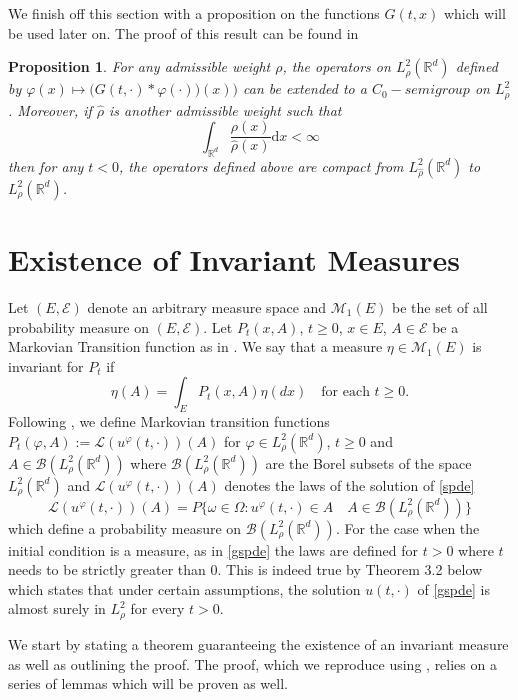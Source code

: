 \documentclass{article}
\newtheorem{proposition}{Proposition}
\numberwithin{equation}{section}
\newcommand{\R}{\mathbb{R}}
\newcommand{\ud}{\ensuremath{\mathrm{d}}}
\begin{document}
We finish off this section with a proposition on the functions $G(t,x)$ which will be used later on. The proof of this result can be found in \cite{TessitoreZabczyk98M} \\

\begin{proposition} \textit{For any admissible weight $\rho$, the operators on $L^2_\rho(\R^d)$ defined by $\varphi(x) \mapsto \big(G(t,\cdot)*\varphi(\cdot)\big)(x))$ can be extended to a $C_0-semigroup$ on $L^2_\rho$. Moreover, if $\hat\rho$ is another admissible weight such that $$\int_{\R^d}\dfrac{\rho(x)}{\hat\rho(x)}\ud x < \infty$$ then for any $t<0$, the operators defined above are compact from $L^2_{\hat\rho}(\R^d)$ to $L^2_\rho(\R^d)$. }
\end{proposition}

\section{Existence of Invariant Measures}
Let $(E, \mathscr E)$ denote an arbitrary measure space and $\mathcal M_1(E)$ be the set of all probability measure on $(E, \mathscr E)$. Let $P_t(x,A)$, $t\ge0$, $x\in E$, $A \in \mathscr E$ be a Markovian Transition function as in \cite{DZ96}. We say that a measure $\eta \in \mathcal M_1(E)$ is invariant for $P_t$ if 
$$ \eta(A)=\int_E P_t(x,A)\eta(dx) \quad \text{for each $t\ge 0$}. $$   
Following \cite{DZ96}, we define Markovian transition functions $P_t(\varphi,A) := \mathscr L (u^\varphi(t,\cdot))(A)$ for $\varphi \in L^2_{\rho}(\R^d)$, $t \ge 0$ and $A \in \mathscr B (L^2_{\rho}(\R^d))$ where $\mathscr B (L^2_\rho(\R^d))$ are the Borel subsets of the space $L^2_\rho(\R^d)$ and $\mathscr L (u^\varphi(t,\cdot))(A)$ denotes the laws of the solution of \eqref{spde} 
$$ \mathscr L (u^\varphi(t,\cdot))(A) = P\{\omega \in \Omega : u^\varphi(t,\cdot) \in A \quad A \in \mathscr B(L^2_\rho(\R^d))\} $$ 
which define a probability measure on $\mathscr B(L^2_\rho(\R^d))$. For the case when the initial condition is a measure, as in \eqref{gspde} the laws are defined for $t>0$ where $t$ needs to be strictly greater than $0$. This is indeed true by Theorem 3.2 below which states that under certain assumptions, the solution $u(t,\cdot)$ of \eqref{gspde} is almost surely in $L^2_{\rho}$ for every $t>0$. 

We start by stating a theorem guaranteeing the existence of an invariant measure as well as outlining the proof. The proof, which we reproduce using \cite{TessitoreZabczyk98M}, relies on a series of lemmas which will be proven as well.  \\
\end{document}
